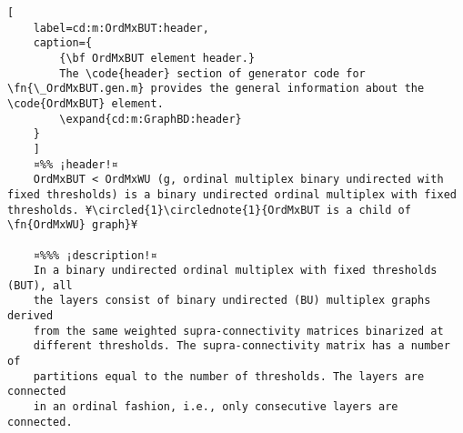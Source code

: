 \documentclass{tufte-handout}
\begin{document}
\begin{lstlisting}[
	label=cd:m:OrdMxBUT:header,
	caption={
		{\bf OrdMxBUT element header.}
		The \code{header} section of generator code for \fn{\_OrdMxBUT.gen.m} provides the general information about the \code{OrdMxBUT} element.
		\expand{cd:m:GraphBD:header}
	}
	]
	¤%% ¡header!¤
	OrdMxBUT < OrdMxWU (g, ordinal multiplex binary undirected with fixed thresholds) is a binary undirected ordinal multiplex with fixed thresholds. ¥\circled{1}\circlednote{1}{OrdMxBUT is a child of \fn{OrdMxWU} graph}¥
	
	¤%%% ¡description!¤
	In a binary undirected ordinal multiplex with fixed thresholds (BUT), all
	the layers consist of binary undirected (BU) multiplex graphs derived
	from the same weighted supra-connectivity matrices binarized at
	different thresholds. The supra-connectivity matrix has a number of
	partitions equal to the number of thresholds. The layers are connected
	in an ordinal fashion, i.e., only consecutive layers are connected.
	
\end{lstlisting}
\end{document}
